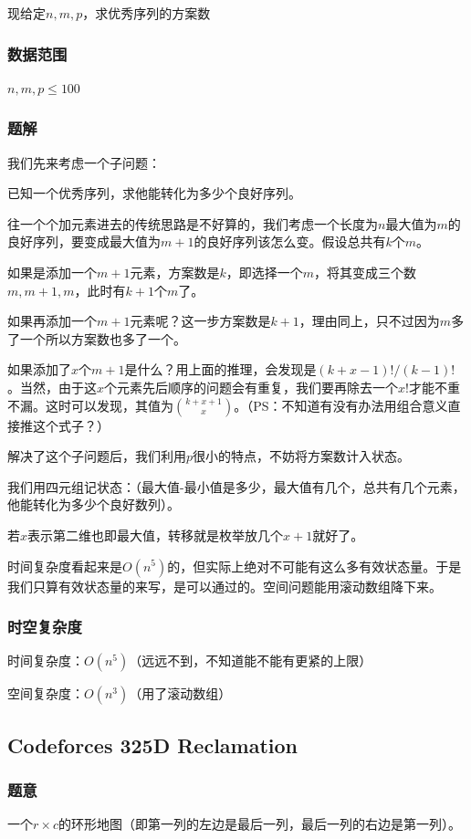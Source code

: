 \documentclass{ctexart}
\begin{document}
现给定$n,m,p$，求优秀序列的方案数
\subsubsection{数据范围}
$n,m,p \le 100$
\subsubsection{题解}
我们先来考虑一个子问题：

已知一个优秀序列，求他能转化为多少个良好序列。

往一个个加元素进去的传统思路是不好算的，我们考虑一个长度为$n$最大值为$m$的良好序列，要变成最大值为$m+1$的良好序列该怎么变。假设总共有$k$个$m$。

如果是添加一个$m+1$元素，方案数是$k$，即选择一个$m$，将其变成三个数$m,m+1,m$，此时有$k+1$个$m$了。

如果再添加一个$m+1$元素呢？这一步方案数是$k+1$，理由同上，只不过因为$m$多了一个所以方案数也多了一个。

如果添加了$x$个$m+1$是什么？用上面的推理，会发现是$(k+x-1)!/(k-1)!$。当然，由于这$x$个元素先后顺序的问题会有重复，我们要再除去一个$x!$才能不重不漏。这时可以发现，其值为${{k+x+1} \choose {x}}$。（PS：不知道有没有办法用组合意义直接推这个式子？）

解决了这个子问题后，我们利用$p$很小的特点，不妨将方案数计入状态。

我们用四元组记状态：（最大值-最小值是多少，最大值有几个，总共有几个元素，他能转化为多少个良好数列）。

若$x$表示第二维也即最大值，转移就是枚举放几个$x+1$就好了。

时间复杂度看起来是$O(n^5)$的，但实际上绝对不可能有这么多有效状态量。于是我们只算有效状态量的来写，是可以通过的。空间问题能用滚动数组降下来。
\subsubsection{时空复杂度}
时间复杂度：$O(n^5)$（远远不到，不知道能不能有更紧的上限）

空间复杂度：$O(n^3)$（用了滚动数组）
\subsection{Codeforces 325D Reclamation}
\subsubsection{题意}
一个$r \times c$的环形地图（即第一列的左边是最后一列，最后一列的右边是第一列）。
\end{document}
